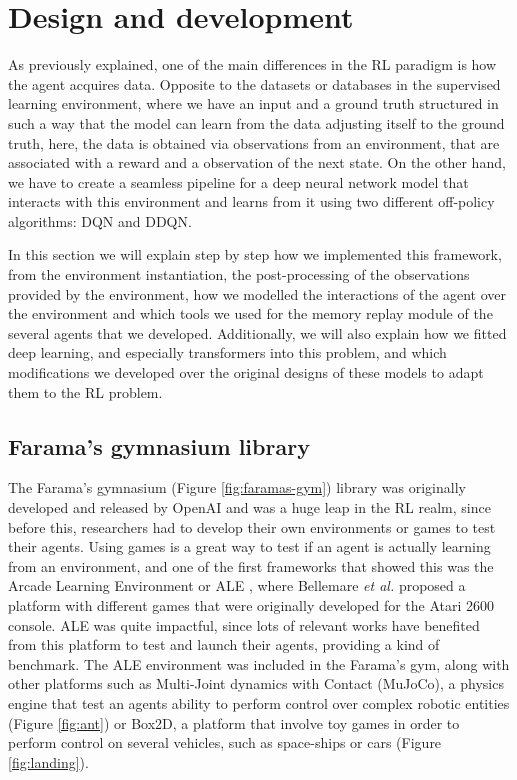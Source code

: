 \chapter{Design and development}
\label{cha:design-development}
As previously explained, one of the main differences in the RL paradigm is how the agent acquires data. Opposite to the datasets or databases in the supervised learning environment, where we have an input and a ground truth structured in such a way that the model can learn from the data adjusting itself to the ground truth, here, the data is obtained via observations from an environment, that are associated with a reward and a observation of the next state. On the other hand, we have to create a seamless pipeline for a deep neural network model that interacts with this environment and learns from it using two different off-policy algorithms: DQN and DDQN.

In this section we will explain step by step how we implemented this framework, from the environment instantiation, the post-processing of the observations provided by the environment, how we modelled the interactions of the agent over the environment and which tools we used for the memory replay module of the several agents that we developed. Additionally, we will also explain how we fitted deep learning, and especially transformers into this problem, and which modifications we developed over the original designs of these models to adapt them to the RL problem.

\section{Farama's gymnasium library}
The Farama's gymnasium (Figure \ref{fig:faramas-gym}) library was originally developed and released by OpenAI and was a huge leap in the RL realm, since before this, researchers had to develop their own environments or games to test their agents. Using games is a great way to test if an agent is actually learning from an environment, and one of the first frameworks that showed this was the Arcade Learning Environment or ALE \cite{Bellemare_2013}, where Bellemare \textit{et al.} proposed a platform with different games that were originally developed for the Atari 2600 console. ALE was quite impactful, since lots of relevant works have benefited from this platform to test and launch their agents, providing a kind of benchmark. The ALE environment was included in the Farama's gym, along with other platforms such as Multi-Joint dynamics with Contact (MuJoCo), a physics engine that test an agents ability to perform control over complex robotic entities (Figure \ref{fig:ant}) or Box2D, a platform that involve toy games in order to perform control on several vehicles, such as space-ships or cars (Figure \ref{fig:landing}).

